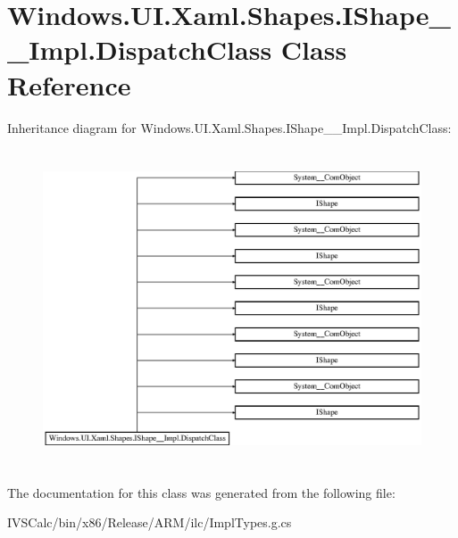 \hypertarget{class_windows_1_1_u_i_1_1_xaml_1_1_shapes_1_1_i_shape_____impl_1_1_dispatch_class}{}\section{Windows.\+U\+I.\+Xaml.\+Shapes.\+I\+Shape\+\_\+\+\_\+\+Impl.\+Dispatch\+Class Class Reference}
\label{class_windows_1_1_u_i_1_1_xaml_1_1_shapes_1_1_i_shape_____impl_1_1_dispatch_class}
Inheritance diagram for Windows.\+U\+I.\+Xaml.\+Shapes.\+I\+Shape\+\_\+\+\_\+\+Impl.\+Dispatch\+Class\+:\begin{figure}[H]
\begin{center}
\leavevmode
\includegraphics[height=9.447853cm]{class_windows_1_1_u_i_1_1_xaml_1_1_shapes_1_1_i_shape_____impl_1_1_dispatch_class}
\end{center}
\end{figure}


The documentation for this class was generated from the following file\+:\begin{DoxyCompactItemize}
\item 
I\+V\+S\+Calc/bin/x86/\+Release/\+A\+R\+M/ilc/Impl\+Types.\+g.\+cs\end{DoxyCompactItemize}

